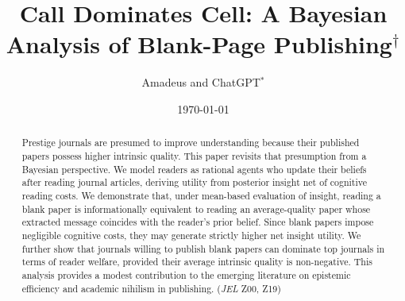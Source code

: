 \documentclass[AER]{AEA}
\begin{document}
\setcounter{page}{4}

\title{Call Dominates Cell: A Bayesian Analysis of Blank-Page Publishing$^\dagger$}

\author{Amadeus and ChatGPT$^*$}

\date{\today}


\begin{abstract}
Prestige journals are presumed to improve understanding because their published papers possess higher intrinsic quality. This paper revisits that presumption from a Bayesian perspective. We model readers as rational agents who update their beliefs after reading journal articles, deriving utility from posterior insight net of cognitive reading costs. We demonstrate that, under mean-based evaluation of insight, reading a blank paper is informationally equivalent to reading an average-quality paper whose extracted message coincides with the reader's prior belief. Since blank papers impose negligible cognitive costs, they may generate strictly higher net insight utility. We further show that journals willing to publish blank papers can dominate top journals in terms of reader welfare, provided their average intrinsic quality is non-negative. This analysis provides a modest contribution to the emerging literature on epistemic efficiency and academic nihilism in publishing.
\noindent (\textit{JEL} Z00, Z19)
\end{abstract}

\maketitle

\let\thefootnote\relax{}
\let\thefootnote\relax{}
\end{document}
